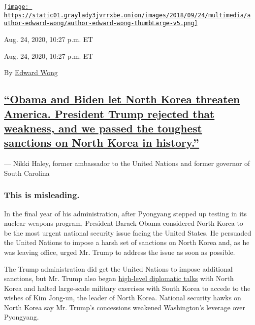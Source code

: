 \href{https://www.nytimes3xbfgragh.onion/by/edward-wong}{\texttt{[image: https://static01.graylady3jvrrxbe.onion/images/2018/09/24/multimedia/author-edward-wong/author-edward-wong-thumbLarge-v5.png]}}

Aug. 24, 2020, 10:27 p.m. ET

Aug. 24, 2020, 10:27 p.m. ET

By \href{https://www.nytimes3xbfgragh.onion/by/edward-wong}{Edward Wong}

\hypertarget{obama-and-biden-let-north-korea-threaten-america-president-trump-rejected-that-weakness-and-we-passed-the-toughest-sanctions-on-north-korea-in-history}{%
\subsection{\texorpdfstring{\protect\hyperlink{obama-and-biden-let-north-korea-threaten-america-president-trump-rejected-that-weakness-and-we-passed-the-toughest-sanctions-on-}{``Obama
and Biden let North Korea threaten America. President Trump rejected
that weakness, and we passed the toughest sanctions on North Korea in
history.''}}{``Obama and Biden let North Korea threaten America. President Trump rejected that weakness, and we passed the toughest sanctions on North Korea in history.''}}\label{obama-and-biden-let-north-korea-threaten-america-president-trump-rejected-that-weakness-and-we-passed-the-toughest-sanctions-on-north-korea-in-history}}

--- Nikki Haley, former ambassador to the United Nations and former
governor of South Carolina

\hypertarget{this-is-misleading-2}{%
\subsubsection{This is misleading.}\label{this-is-misleading-2}}

In the final year of his administration, after Pyongyang stepped up
testing in its nuclear weapons program, President Barack Obama
considered North Korea to be the most urgent national security issue
facing the United States. He persuaded the United Nations to impose a
harsh set of sanctions on North Korea and, as he was leaving office,
urged Mr. Trump to address the issue as soon as possible.

The Trump administration did get the United Nations to impose additional
sanctions, but Mr. Trump also began
\href{https://www.nytimes3xbfgragh.onion/2018/06/12/world/asia/north-korea-summit.html}{high-level
diplomatic talks} with North Korea and halted large-scale military
exercises with South Korea to accede to the wishes of Kim Jong-un, the
leader of North Korea. National security hawks on North Korea say Mr.
Trump's concessions weakened Washington's leverage over Pyongyang.

